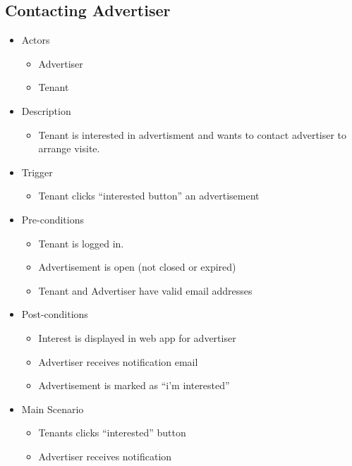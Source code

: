 \documentclass[a4paper,11pt]{article}
\begin{document}
\subsection*{Contacting Advertiser}
\begin{itemize}
  \item Actors
    \begin{itemize}
      \item Advertiser
      \item Tenant
    \end{itemize}
  \item Description
    \begin{itemize}
      \item Tenant is interested in advertisment and wants to contact advertiser to arrange visite.
    \end{itemize}
 \item Trigger
    \begin{itemize}
      \item Tenant clicks “interested button” an advertisement
    \end{itemize}
  \item Pre-conditions
    \begin{itemize}
    \item Tenant is logged in.
    \item Advertisement is open (not closed or expired)
    \item Tenant and Advertiser have valid email addresses
    \end{itemize}
  \item Post-conditions
    \begin{itemize}
      \item Interest is displayed in web app for advertiser
      \item Advertiser receives notification email
      \item Advertisement is marked as “i'm interested”
    \end{itemize}
  \item Main Scenario
    \begin{itemize}
      \item Tenants clicks “interested” button
      \item Advertiser receives notification
    \end{itemize}
\end{itemize}
\end{document}
